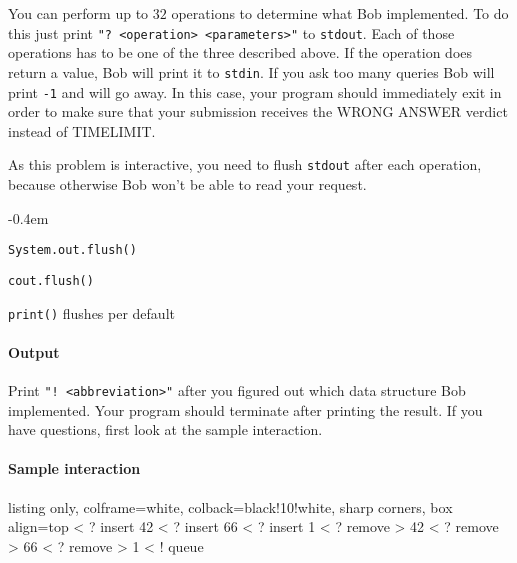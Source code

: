 You can perform up to $32$ operations to determine what Bob implemented. To do this just print
\texttt{"? <operation> <parameters>"} to \texttt{stdout}. Each
of those operations has to be one of the three described above. If the
operation does return a value, Bob will print it to \texttt{stdin}. 
If you ask too many queries Bob will print \texttt{-1} and will go away. In this case,
your program should immediately exit in order to make sure that your submission
receives the WRONG ANSWER verdict instead of TIMELIMIT.

As this problem is interactive, you need to flush \texttt{stdout} after each operation, because otherwise Bob won't be able to read your request.
\begin{description}
	\itemsep-0.4em
	\item[Java:] \texttt{System.out.flush()}
	\item[C++:] \texttt{cout.flush()}
    \item[Python] \texttt{print()} flushes per default
\end{description}

\paragraph*{Output}

Print \texttt{"! <abbreviation>"} after you figured out which data structure Bob
implemented. Your program should terminate
after printing the result. If you have questions, first look at the sample interaction.

\paragraph*{Sample interaction}

\noindent\begin{tcblisting}{listing only, colframe=white, colback=black!10!white, sharp corners, box align=top}
< ? insert 42
< ? insert 66
< ? insert 1
< ? remove
> 42
< ? remove
> 66
< ? remove
> 1
< ! queue
\end{tcblisting}


